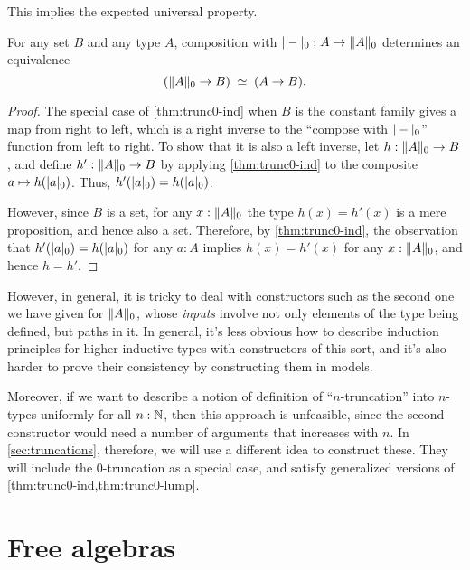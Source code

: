 This implies the expected universal property.

\begin{lem}\label{thm:trunc0-lump}
  For any set $B$ and any type $A$, composition with $\tprojf0:A\to \trunc0A$ determines an equivalence
  \[ \eqvspaced{(\trunc0A\to B)}{(A\to B)}. \]
\end{lem}
\begin{proof}
  The special case of \autoref{thm:trunc0-ind} when $B$ is the constant family gives a map from right to left, which is a right inverse to the ``compose with $\tprojf0$'' function from left to right.
  To show that it is also a left inverse, let $h:\trunc0A\to B$, and define $h':\trunc0A\to B$ by applying \autoref{thm:trunc0-ind} to the composite $a\mapsto h(\tproj0a)$.
  Thus, $h'(\tproj0a)=h(\tproj0a)$.

  However, since $B$ is a set, for any $x:\trunc0A$ the type $h(x)=h'(x)$ is a mere proposition, and hence also a set.
  Therefore, by \autoref{thm:trunc0-ind}, the observation that $h'(\tproj0a)=h(\tproj0a)$ for any $a:A$ implies $h(x)=h'(x)$ for any $x:\trunc0A$, and hence $h=h'$.
\end{proof}

However, in general, it is tricky to deal with constructors such as the second one we have given for $\trunc0A$, whose \emph{inputs} involve not only elements of the type being defined, but paths in it.
In general, it's less obvious how to describe induction principles for higher inductive types with constructors of this sort, and it's also harder to prove their consistency by constructing them in models.

Moreover, if we want to describe a notion of definition of ``$n$-truncation'' into $n$-types uniformly for all $n:\nat$, then this approach is unfeasible, since the second constructor would need a number of arguments that increases with $n$.
In \autoref{sec:truncations}, therefore, we will use a different idea to construct these.
They will include the 0-truncation as a special case, and satisfy generalized versions of \autoref{thm:trunc0-ind,thm:trunc0-lump}.


\section{Free algebras}
\label{sec:free-algebras}

